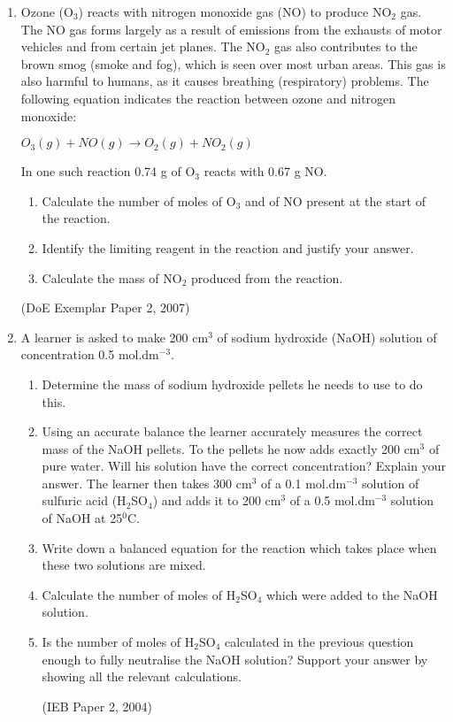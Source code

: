 {\begin{enumerate}
\item{Ozone (O$_{3}$) reacts with nitrogen monoxide gas (NO) to produce NO$_{2}$ gas. The NO gas forms largely as a result of emissions from the exhausts of motor vehicles and from certain jet planes. The NO$_{2}$ gas also contributes to the brown smog (smoke and fog), which is seen over most urban areas. This gas is also harmful to humans, as it causes breathing (respiratory) problems. The following equation indicates the reaction between ozone and nitrogen monoxide:
\begin{center}
\rm${O_{3}(g) + NO(g) \rightarrow O_{2}(g) + NO_{2}(g)}$
\end{center}
In one such reaction 0.74 g of O$_{3}$ reacts with 0.67 g NO.
	\begin{enumerate}
	\item{Calculate the number of moles of O$_{3}$ and of NO present at the start of the reaction.}
	\item{Identify the limiting reagent in the reaction and justify your answer.}
	\item{Calculate the mass of NO$_{2}$ produced from the reaction.}
	\end{enumerate}
(DoE Exemplar Paper 2, 2007)}
\item{A learner is asked to make 200 cm$^{3}$ of sodium hydroxide (NaOH) solution of concentration 0.5 mol.dm$^{-3}$.
	\begin{enumerate}
	\item{Determine the mass of sodium hydroxide pellets he needs to use to do this.}
	\item{Using an accurate balance the learner accurately measures the correct mass of the NaOH pellets. To the pellets he now adds exactly 200 cm$^{3}$ of pure water. Will his solution have the correct concentration? Explain your answer.
\newline
The learner then takes 300 cm$^{3}$ of a 0.1 mol.dm$^{-3}$ solution of sulfuric acid (H$_{2}$SO$_{4}$) and adds it to 200 cm$^{3}$ of a 0.5 mol.dm$^{-3}$ solution of NaOH at 25$^{0}$C.}
	\item{Write down a balanced equation for the reaction which takes place when these two solutions are mixed.}
	\item{Calculate the number of moles of H$_{2}$SO$_{4}$ which were added to the NaOH solution.}
	\item{Is the number of moles of H$_{2}$SO$_{4}$ calculated in the previous question enough to fully neutralise the NaOH solution? Support your answer by showing all the relevant calculations.}

(IEB Paper 2, 2004)
	\end{enumerate}
}
\end{enumerate}
}

